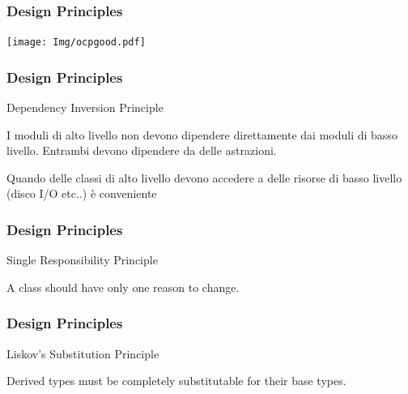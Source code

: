 \documentclass{beamer}
\begin{document}
\begin{frame}
\frametitle{Design Principles}
\texttt{[image: Img/ocpgood.pdf]}
\end{frame}


\begin{frame}
\frametitle{Design Principles}
Dependency Inversion Principle
\begin{framed}
I moduli di alto livello non devono dipendere direttamente dai moduli di basso livello. Entrambi devono dipendere da delle astrazioni.
\end{framed}
Quando delle classi di alto livello devono accedere a delle risorse di basso livello (disco I/O etc..) \`e conveniente
\end{frame}


\begin{frame}
\frametitle{Design Principles}
Single Responsibility Principle
\begin{framed}
A class should have only one reason to change.
\end{framed}
\end{frame}

\begin{frame}
\frametitle{Design Principles}
Liskov's Substitution Principle
\begin{framed}
Derived types must be completely substitutable for their base types.
\end{framed}
\end{frame}




\end{document}
